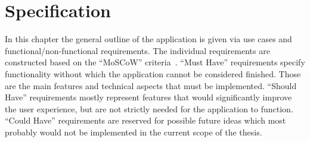 \chapter{Specification}\label{ch:specification}

In this chapter the general outline of the application is given via use cases and functional/non-functional requirements.
The individual requirements are constructed based on the ``MoSCoW'' criteria~\parencite{moscow}.
``Must Have'' requirements specify functionality without which the application cannot be considered finished.
Those are the main features and technical aspects that must be implemented.
``Should Have'' requirements mostly represent features that would significantly improve the user experience,
but are not strictly needed for the application to function.
``Could Have'' requirements are reserved for possible future ideas which most probably would not be
implemented in the current scope of the thesis.


